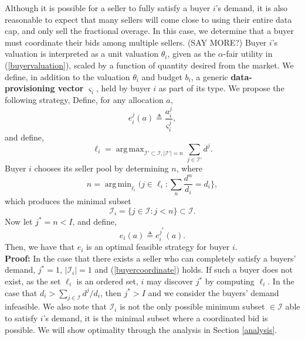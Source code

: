 \documentclass[12pt]{article}
\theoremstyle{definition}
\newcommand{\vs}{\varsigma}
\newcommand{\mcI}{\mathcal{I}}
\DeclareMathOperator*{\argmax}{arg\,max}
\DeclareMathOperator*{\argmin}{arg\,min}
\begin{document}
\begin{multicols}{2}
Although it is possible for a seller to fully satisfy a buyer $i$'s demand, it
is also reasonable to expect that many sellers will come close to using their
entire data cap, and only sell the fractional overage. In this case, we
determine that a buyer must coordinate their bids among multiple sellers. (SAY
MORE?) Buyer $i$'s valuation is interpreted as a unit valuation $\theta_i$, given as
the $\alpha$-fair utility in (\ref{buyervaluation}), scaled
by a function of quantity desired from the market. 
We define, in addition to the valuation $\theta_i$ and budget $b_i$, a generic
\textbf{data-provisioning vector} $\vs_i$, held by buyer $i$ as part of its type. We propose the
following strategy,
{
\label{buyerstrategy}
Define, for any allocation $a$,
\begin{equation}\label{opt-out}
    e_i^j(a) \triangleq \frac{a_i^j}{\vs_i^j},
\end{equation}
and define,
$$
    \ell_i =\argmax_{\mcI' \subset \mcI, \vert\mcI'\vert =
n}\sum_{j\in\mcI'} d^j.
$$
Buyer $i$ chooses its seller pool by determining $n$, where
\begin{equation}\label{buyercoordinate}
    n = \argmin_{\ell_i}(j \in \ell_i : \displaystyle\sum_{n} \frac{d^n}{d_i} = d_i\rbrace,
\end{equation} 
which produces the minimal subset 
\begin{equation}\label{buyers}
    \mcI_i = \lbrace j \in \mcI : j < n\rbrace \subset \mcI.
\end{equation} 
Now let $j^* = n < I$, and define, 
\begin{equation}\label{opt-quantity}
    e_i(a) \triangleq e_i^{j^*}(a).
\end{equation}
Then, we have that $e_i$
is an optimal feasible strategy for buyer $i$.
}\\
\textbf{Proof:}
In the case that there exists a seller who can completely satisfy a buyers'
demand, $j^*=1$, $\vert \mcI_i\vert =1$ and (\ref{buyercoordinate}) holds. If such a buyer does not exist,
as the set $\ell_i$ is an ordered set, $i$ may discover 
$j^*$ by computing $\ell_i$. In the case that $d_i >
\sum_{j\in\mcI}d^j/d_i$, then $j^* > I$ and we consider the buyers' demand
infeasible. 
We also note that $\mcI_i$ is not the only
possible minimum subset $\in\mcI$ able to satisfy $i$'s demand, it is the minimal subset where a
coordinated bid is possible. We will show optimality through the
analysis in Section \ref{analysis}.


\end{multicols}
\end{document}
